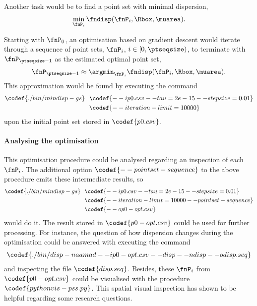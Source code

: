 %
Another task would be to find a point set with minimal dispersion,
\begin{align*}
  \min_{\fnP_i} \fndisp(\fnP_i, \Rbox, \muarea).
\end{align*}

Starting with $\fnP_0$, an optimisation based on gradient descent would iterate through a sequence of point sets, $\fnP_i$, $i \in [0,\ptseqsize)$, to terminate with $\fnP_{\ptseqsize-1}$ as the estimated optimal point set,
\begin{align*}
  \fnP_{\ptseqsize-1} \approx \argmin_{\fnP_i} \fndisp(\fnP_i, \Rbox, \muarea).
\end{align*}
This approximation would be found by executing the command
\begin{align*}
  \codef{./bin/mindisp-gs}\ \ &\codef{--i p0.csv --tau=2e-15 --stepsize=0.01}\\
  &\codef{--iteration-limit=10000}
\end{align*}
upon the initial point set stored in $\codef{p0.csv}$. 

\paragraph{Analysing the optimisation}

This optimisation procedure could be analysed regarding an inspection of each $\fnP_i$. The additional option $\codef{--pointset-sequence}$ to the above procedure emits these intermediate results, so
\begin{align*}
  \codef{./bin/mindisp-gs}\ \ &\codef{--i p0.csv --tau=2e-15 --stepsize=0.01}\\
  &\codef{--iteration-limit=10000 --pointset-sequence}\\
  &\codef{--o p0-opt.csv}
\end{align*}
would do it. The result stored in $\codef{p0-opt.csv}$ could be used for further processing. For instance, the question of how dispersion changes during the optimisation could be answered with executing the command
\begin{align*}
  \codef{./bin/disp-naamad --i p0-opt.csv --disp --ndisp --o disp.seq}
\end{align*}
and inspecting the file $\codef{disp.seq}$. Besides, these $\fnP_i$ from $\codef{p0-opt.csv}$ could be visualised with the procedure $\codef{python vis-pss.py}$. This spatial visual inspection has shown to be helpful regarding some research questions.
